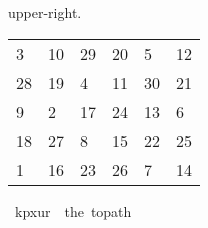\begin{isabellebody}
\begin{isamarkuptext}
upper-right.
  \begin{table}[H]
    \begin{tabular}{llllll}
       3 & 10 & 29 & 20 &  5 & 12 \\
      28 & 19 &  4 & 11 & 30 & 21 \\
       9 &  2 & 17 & 24 & 13 &  6 \\
      18 & 27 &  8 & 15 & 22 & 25 \\
       1 & 16 & 23 & 26 &  7 & 14
    \end{tabular}
  \end{table}%
\end{isamarkuptext}\isamarkuptrue%
\isamarkupfalse%
\ {\isachardoublequoteopen}kp{}x{}ur\ {\isasymequiv}\ the\ {\isacharparenleft}{\kern0pt}to{\isacharunderscore}{\kern0pt}path\ \isanewline
\ \ {\isacharbrackleft}{\kern0pt}{\isacharbrackleft}{\kern0pt}{}{\isacharcomma}{\kern0pt}{}{}{\isacharcomma}{\kern0pt}{}{}{\isacharcomma}{\kern0pt}{}{}{\isacharcomma}{\kern0pt}{}{\isacharcomma}{\kern0pt}{}{}{\isacharbrackright}{\kern0pt}{\isacharcomma}{\kern0pt}\isanewline
\ \ {\isacharbrackleft}{\kern0pt}{}{}{\isacharcomma}{\kern0pt}{}{}{\isacharcomma}{\kern0pt}{}{\isacharcomma}{\kern0pt}{}{}{\isacharcomma}{\kern0pt}{}{}{\isacharcomma}{\kern0pt}{}{}{\isacharbrackright}{\kern0pt}{\isacharcomma}{\kern0pt}\isanewline
\ \ {\isacharbrackleft}{\kern0pt}{}{\isacharcomma}{\kern0pt}{}{\isacharcomma}{\kern0pt}{}{}{\isacharcomma}{\kern0pt}{}{}{\isacharcomma}{\kern0pt}{}{}{\isacharcomma}{\kern0pt}{}{\isacharbrackright}{\kern0pt}{\isacharcomma}{\kern0pt}\isanewline
\ \ {\isacharbrackleft}{\kern0pt}{}{}{\isacharcomma}{\kern0pt}{}{}{\isacharcomma}{\kern0pt}{}{\isacharcomma}{\kern0pt}{}{}{\isacharcomma}{\kern0pt}{}{}{\isacharcomma}{\kern0pt}{}{}{\isacharbrackright}{\kern0pt}{\isacharcomma}{\kern0pt}\isanewline
\ \ {\isacharbrackleft}{\kern0pt}{}{\isacharcomma}{\kern0pt}{}{}{\isacharcomma}{\kern0pt}{}{}{\isacharcomma}{\kern0pt}{}{}{\isacharcomma}{\kern0pt}{}{\isacharcomma}{\kern0pt}{}{}{\isacharbrackright}{\kern0pt}{\isacharbrackright}{\kern0pt}{\isacharparenright}{\kern0pt}{\isachardoublequoteclose}\isanewline

\end{isabellebody}
